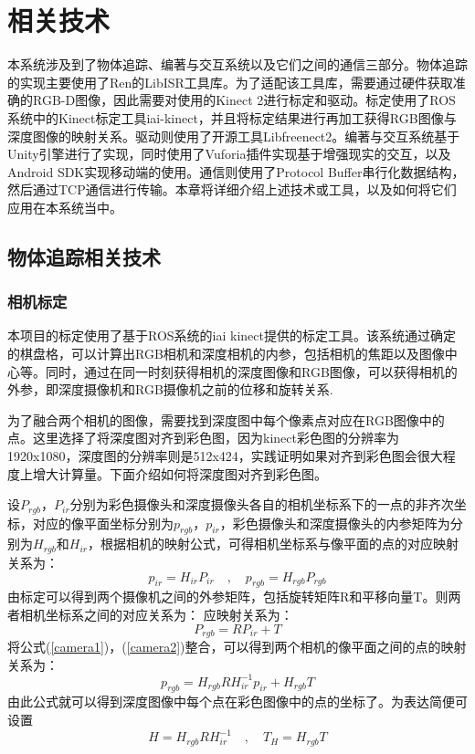 \chapter{相关技术}
\label{chap:tech}

本系统涉及到了物体追踪、编著与交互系统以及它们之间的通信三部分。物体追踪的实现主要使用了Ren的LibISR工具库\cite{Ren_3DV_2014,star3d_iccv_2013}。为了适配该工具库，需要通过硬件获取准确的RGB-D图像，因此需要对使用的Kinect 2进行标定和驱动。标定使用了ROS系统中的Kinect标定工具iai-kinect\cite{iai_kinect2}，并且将标定结果进行再加工获得RGB图像与深度图像的映射关系。驱动则使用了开源工具Libfreenect2\cite{libfreenect2}。编著与交互系统基于Unity引擎\cite{Unity}进行了实现，同时使用了Vuforia插件\cite{Vuforia}实现基于增强现实的交互，以及Android SDK\cite{Android}实现移动端的使用。通信则使用了Protocol Buffer\cite{Protobuf, ProtobufNet}串行化数据结构，然后通过TCP通信进行传输。本章将详细介绍上述技术或工具，以及如何将它们应用在本系统当中。

\section{物体追踪相关技术}
\subsection{相机标定}
本项目的标定使用了基于ROS系统的iai kinect提供的标定工具。该系统通过确定的棋盘格，可以计算出RGB相机和深度相机的内参，包括相机的焦距以及图像中心等。同时，通过在同一时刻获得相机的深度图像和RGB图像，可以获得相机的外参，即深度摄像机和RGB摄像机之前的位移和旋转关系.

为了融合两个相机的图像，需要找到深度图中每个像素点对应在RGB图像中的点。这里选择了将深度图对齐到彩色图，因为kinect彩色图的分辨率为1920x1080，深度图的分辨率则是512x424，实践证明如果对齐到彩色图会很大程度上增大计算量。下面介绍如何将深度图对齐到彩色图。

设$P_{rgb}$，$P_{ir}$分别为彩色摄像头和深度摄像头各自的相机坐标系下的一点的非齐次坐标，对应的像平面坐标分别为$p_{rgb}$，$p_{ir}$，彩色摄像头和深度摄像头的内参矩阵为分别为$H_{rgb}$和$H_{ir}$，根据相机的映射公式，可得相机坐标系与像平面的点的对应映射关系为：
\begin{equation}
 p_{ir} = H_{ir}P_{ir} \quad\mathrm{,}\quad  p_{rgb} = H_{rgb}P_{rgb}\label{camera1}
\end{equation}
由标定可以得到两个摄像机之间的外参矩阵，包括旋转矩阵R和平移向量T。则两者相机坐标系之间的对应关系为：
应映射关系为：
\begin{equation}
 P_{rgb} = RP_{ir} + T \label{camera2}
\end{equation}
将公式(\ref{camera1})，(\ref{camera2})整合，可以得到两个相机的像平面之间的点的映射关系为：
\begin{equation}
 p_{rgb} = H_{rgb}RH_{ir}^{-1}p_{ir} + H_{rgb}T
\end{equation}
由此公式就可以得到深度图像中每个点在彩色图像中的点的坐标了。为表达简便可设置
\begin{equation}
 H = H_{rgb}RH_{ir}^{-1} \quad\mathrm{,}\quad T_H = H_{rgb}T
\end{equation}

